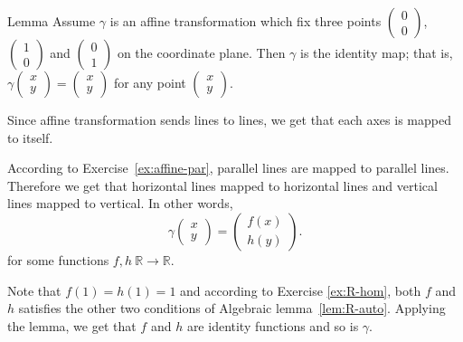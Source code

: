\begin{thm}{Lemma}\label{lem:3-fix}
Assume $\gamma$ is an affine transformation which fix three points $\left(\begin{smallmatrix}
0\\ 0
\end{smallmatrix} \right)$, 
$\left(\begin{smallmatrix}
1\\ 0
\end{smallmatrix} \right)$ 
and $\left(\begin{smallmatrix}
0\\ 1
\end{smallmatrix} \right)$ on the coordinate plane.
Then $\gamma$ is the identity map; 
that is, $\gamma\left(\begin{smallmatrix}
x\\ y
\end{smallmatrix} \right)
=
\left(\begin{smallmatrix}
x\\ y
\end{smallmatrix} \right)$ for any point $\left(\begin{smallmatrix}
x\\ y
\end{smallmatrix} \right)$.
\end{thm}

Since affine transformation sends lines to lines, we get that each axes is mapped to itself.

According to Exercise~\ref{ex:affine-par}, 
parallel lines are mapped to parallel lines.
Therefore we get that horizontal lines mapped to horizontal lines 
and
vertical lines mapped to vertical.
In other words,
\[\gamma\left(\begin{smallmatrix}
x\\ y
\end{smallmatrix} \right)
=
\left(\begin{smallmatrix}
f(x)\\ h(y)
\end{smallmatrix} \right).\]
for some functions $f,h\:\mathbb{R}\to\mathbb{R}$.

Note that $f(1)=h(1)=1$ and according to 
Exercise \ref{ex:R-hom}, 
both $f$ and $h$ satisfies the other two conditions of Algebraic lemma~\ref{lem:R-auto}.
Applying the lemma, we get that $f$ and $h$ 
are identity functions
and so is $\gamma$.
\qeds


